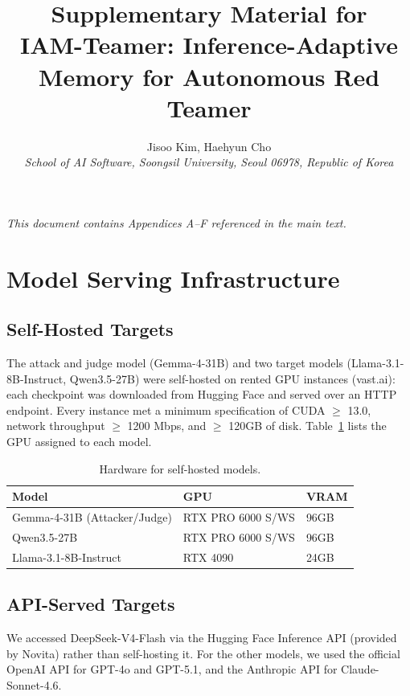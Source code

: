 \documentclass[11pt]{article}
\title{Supplementary Material for\\ IAM-Teamer: Inference-Adaptive Memory for Autonomous Red Teamer}
\author{
  \large Jisoo Kim,
  \large Haehyun Cho \\[4pt]
  \small\itshape School of AI Software, Soongsil University, Seoul 06978, Republic of Korea
}
\date{}
\begin{document}
\maketitle

\noindent\emph{This document contains Appendices A--F referenced in the main text.}\medskip

\appendix
{}

\section{Model Serving Infrastructure}
\label{app:infra}

\subsection{Self-Hosted Targets}
The attack and judge model (Gemma-4-31B) and two target models (Llama-3.1-8B-Instruct, Qwen3.5-27B) were self-hosted on rented GPU instances (vast.ai): each checkpoint was downloaded from Hugging Face and served over an HTTP endpoint.
Every instance met a minimum specification of CUDA $\ge$ 13.0, network throughput $\ge$ 1200 Mbps, and $\ge$ 120GB of disk.
Table~\ref{tab:serving} lists the GPU assigned to each model.

\begin{table}[htbp]
  \centering
  \caption{Hardware for self-hosted models.}
  \label{tab:serving}
  \footnotesize
  \begin{tabular}{lll}
    \toprule
    \textbf{Model}               & \textbf{GPU}      & \textbf{VRAM} \\
    \midrule
    Gemma-4-31B (Attacker/Judge) & RTX PRO 6000 S/WS & 96GB          \\
    Qwen3.5-27B                  & RTX PRO 6000 S/WS & 96GB          \\
    Llama-3.1-8B-Instruct        & RTX 4090          & 24GB          \\
    \bottomrule
  \end{tabular}
\end{table}

\subsection{API-Served Targets}
We accessed DeepSeek-V4-Flash via the Hugging Face Inference API (provided by Novita) rather than self-hosting it.
For the other models, we used the official OpenAI API for GPT-4o and GPT-5.1, and the Anthropic API for Claude-Sonnet-4.6.
\end{document}
